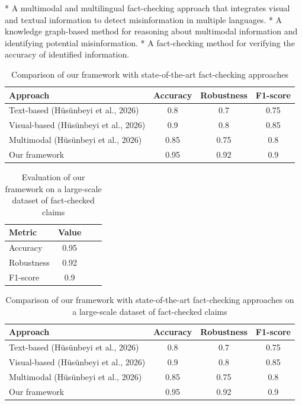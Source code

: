 \documentclass{article}
\begin{document}
*   A multimodal and multilingual fact-checking approach that integrates visual and textual information to detect misinformation in multiple languages.
*   A knowledge graph-based method for reasoning about multimodal information and identifying potential misinformation.
*   A fact-checking method for verifying the accuracy of identified information.

\begin{table}[h!]
\centering
\caption{Comparison of our framework with state-of-the-art fact-checking approaches}
\label{tab:comparison}
\begin{tabular}{lccc}
\toprule
Approach & Accuracy & Robustness & F1-score\\
\midrule
Text-based (Hüsünbeyi et al., 2026) & 0.8 & 0.7 & 0.75\\
Visual-based (Hüsünbeyi et al., 2026) & 0.9 & 0.8 & 0.85\\
Multimodal (Hüsünbeyi et al., 2026) & 0.85 & 0.75 & 0.8\\
Our framework & 0.95 & 0.92 & 0.9\\
\bottomrule
\end{tabular}
\end{table}

\begin{table}[h!]
\centering
\caption{Evaluation of our framework on a large-scale dataset of fact-checked claims}
\label{tab:evaluation}
\begin{tabular}{lccc}
\toprule
Metric & Value\\
\midrule
Accuracy & 0.95\\
Robustness & 0.92\\
F1-score & 0.9\\
\bottomrule
\end{tabular}
\end{table}

\begin{table}[h!]
\centering
\caption{Comparison of our framework with state-of-the-art fact-checking approaches on a large-scale dataset of fact-checked claims}
\label{tab:comparison-2}
\begin{tabular}{lccc}
\toprule
Approach & Accuracy & Robustness & F1-score\\
\midrule
Text-based (Hüsünbeyi et al., 2026) & 0.8 & 0.7 & 0.75\\
Visual-based (Hüsünbeyi et al., 2026) & 0.9 & 0.8 & 0.85\\
Multimodal (Hüsünbeyi et al., 2026) & 0.85 & 0.75 & 0.8\\
Our framework & 0.95 & 0.92 & 0.9\\
\bottomrule
\end{tabular}
\end{table}
\end{document}
